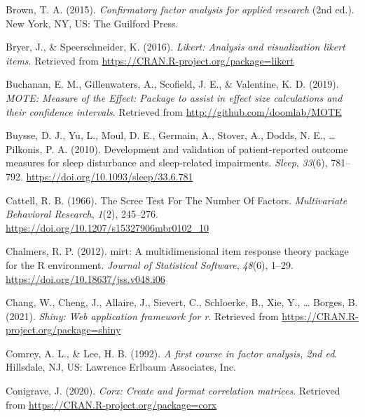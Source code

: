 \documentclass[
  english,
  man]{apa6}
\newlength{\cslhangindent}
\newlength{\cslentryspacingunit} %
\newenvironment{CSLReferences}[2] %
 {%
  \setlength{\parindent}{0pt}
  \ifodd #1
  \let\oldpar\par
  \def\par{\hangindent=\cslhangindent\oldpar}
  \fi
  \setlength{\parskip}{#2\cslentryspacingunit}
 }%
 {}
\begin{document}
\begin{CSLReferences}{1}{0}
\leavevmode{}%
Brown, T. A. (2015). \emph{Confirmatory factor analysis for applied research} (2nd ed.). {New York, NY, US}: {The Guilford Press}.

\leavevmode{}%
Bryer, J., \& Speerschneider, K. (2016). \emph{Likert: Analysis and visualization likert items}. Retrieved from \url{https://CRAN.R-project.org/package=likert}

\leavevmode{}%
Buchanan, E. M., Gillenwaters, A., Scofield, J. E., \& Valentine, K. D. (2019). \emph{{MOTE: Measure of the Effect}: Package to assist in effect size calculations and their confidence intervals}. Retrieved from \url{http://github.com/doomlab/MOTE}

\leavevmode{}%
Buysse, D. J., Yu, L., Moul, D. E., Germain, A., Stover, A., Dodds, N. E., \ldots{} Pilkonis, P. A. (2010). Development and validation of patient-reported outcome measures for sleep disturbance and sleep-related impairments. \emph{Sleep}, \emph{33}(6), 781--792. \url{https://doi.org/10.1093/sleep/33.6.781}

\leavevmode{}%
Cattell, R. B. (1966). The {Scree Test For The Number Of Factors}. \emph{Multivariate Behavioral Research}, \emph{1}(2), 245--276. \url{https://doi.org/10.1207/s15327906mbr0102_10}

\leavevmode{}%
Chalmers, R. P. (2012). {mirt}: A multidimensional item response theory package for the {R} environment. \emph{Journal of Statistical Software}, \emph{48}(6), 1--29. \url{https://doi.org/10.18637/jss.v048.i06}

\leavevmode{}%
Chang, W., Cheng, J., Allaire, J., Sievert, C., Schloerke, B., Xie, Y., \ldots{} Borges, B. (2021). \emph{Shiny: Web application framework for r}. Retrieved from \url{https://CRAN.R-project.org/package=shiny}

\leavevmode{}%
Comrey, A. L., \& Lee, H. B. (1992). \emph{A first course in factor analysis, 2nd ed}. {Hillsdale, NJ, US}: {Lawrence Erlbaum Associates, Inc}.

\leavevmode{}%
Conigrave, J. (2020). \emph{Corx: Create and format correlation matrices}. Retrieved from \url{https://CRAN.R-project.org/package=corx}


\end{CSLReferences}
\end{document}
